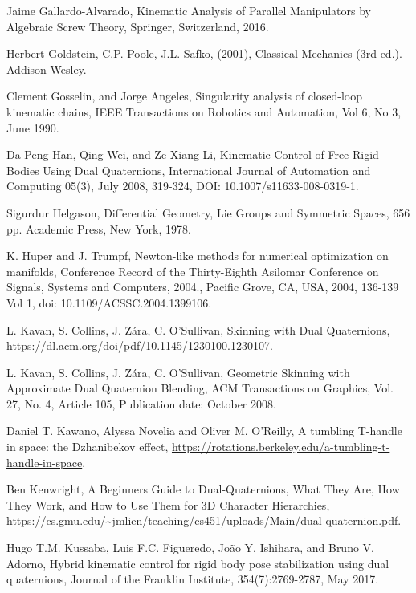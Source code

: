 \documentclass[reqno,12pt]{amsart}
\begin{document}
\begin{thebibliography}{99}
 Jaime Gallardo-Alvarado, Kinematic Analysis of Parallel Manipulators by Algebraic Screw Theory, Springer, Switzerland, 2016.

 Herbert Goldstein, C.P. Poole, J.L. Safko, (2001), Classical Mechanics (3rd ed.). Addison-Wesley.

 Clement Gosselin, and Jorge Angeles, Singularity analysis of closed-loop kinematic chains, IEEE Transactions on Robotics and Automation, Vol 6, No 3, June 1990.

 Da-Peng Han, Qing Wei, and Ze-Xiang Li, Kinematic Control of Free Rigid Bodies Using Dual Quaternions, International Journal of Automation and Computing
05(3), July 2008, 319-324, DOI: 10.1007/s11633-008-0319-1.

 Sigurdur Helgason, Differential Geometry, Lie Groups and Symmetric Spaces, 656 pp. Academic Press, New York, 1978.

 K. Huper and J. Trumpf, Newton-like methods for numerical optimization on manifolds, Conference Record of the Thirty-Eighth Asilomar Conference on Signals, Systems and Computers, 2004., Pacific Grove, CA, USA, 2004, 136-139 Vol 1, doi: 10.1109/ACSSC.2004.1399106.

 L. Kavan, S. Collins, J. \u Z\'ara, C. O'Sullivan, Skinning with Dual Quaternions, \url{https://dl.acm.org/doi/pdf/10.1145/1230100.1230107}.

 L. Kavan, S. Collins, J. \u Z\'ara, C. O'Sullivan, Geometric Skinning with Approximate Dual Quaternion Blending, ACM Transactions on Graphics, Vol. 27, No. 4, Article 105, Publication date: October 2008.

 Daniel T. Kawano, Alyssa Novelia and Oliver M. O'Reilly, A tumbling T-handle in space: the Dzhanibekov effect, \url{https://rotations.berkeley.edu/a-tumbling-t-handle-in-space}.

 Ben Kenwright, A Beginners Guide to Dual-Quaternions, What They Are, How They Work, and How to Use Them for 3D Character Hierarchies, \url{https://cs.gmu.edu/~jmlien/teaching/cs451/uploads/Main/dual-quaternion.pdf}.

 Hugo T.M. Kussaba, Luis F.C. Figueredo, Jo\~ao Y. Ishihara, and Bruno V. Adorno, Hybrid kinematic control for rigid body pose stabilization using dual quaternions, Journal of the Franklin Institute, 354(7):2769-2787, May 2017.


\end{thebibliography}
\end{document}
